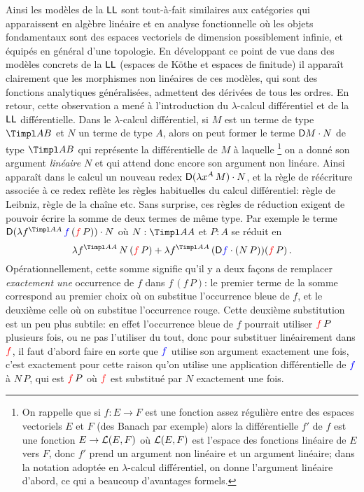\documentclass[a4]{article}
\begin{document}
Ainsi les modèles de la $\hbox{\textsf{LL}}$ sont tout-à-fait similaires aux
catégories qui apparaissent en algèbre linéaire et en analyse
fonctionnelle où les objets fondamentaux sont des espaces vectoriels
de dimension possiblement infinie, et équipés en général d'une
topologie.
%
En développant ce point de vue dans des modèles concrets de la $\hbox{\textsf{LL}}$
(espaces de Köthe et espaces de finitude) il apparaît clairement que
les morphismes non linéaires de ces modèles, qui sont des fonctions
analytiques généralisées, admettent des dérivées de tous les ordres.
%
En retour, cette observation a mené à l'introduction du
$\lambda$-calcul différentiel et de la $\hbox{\textsf{LL}}$ différentielle.
%
Dans le $\lambda$-calcul différentiel, si $M$ est un terme de type
$\Timpl AB$ et $N$ un terme de type $A$, alors on peut former le terme
$\mathsf D{M}\cdot{N}$ de type $\Timpl AB$ qui représente la différentielle de
$M$ à laquelle%
\footnote{On rappelle que si $f:E\to F$ est une fonction assez
  régulière entre des espaces vectoriels $E$ et $F$ (des Banach par
  exemple) alors la différentielle $f'$ de $f$ est une fonction
  $E\to\mathcal{L}(E,F)$ où $\mathcal{L}(E,F)$ est l'espace des fonctions linéaire de
  $E$ vers $F$, donc $f'$ prend un argument non linéaire et un
  argument linéaire; dans la notation adoptée en $\lambda$-calcul
  différentiel, on donne l'argument linéaire d'abord, ce qui a
  beaucoup d'avantages formels.} %
on a donné son argument \emph{linéaire} $N$ et qui attend donc encore
son argument non linéare.
%
Ainsi apparaît dans le calcul un nouveau redex
$\mathsf D{(\lambda x^{A}\,{M})}\cdot{N}$, et la règle de réécriture associée à ce
redex reflète les règles habituelles du calcul différentiel: règle de
Leibniz, règle de la chaîne etc.
%
Sans surprise, ces règles de réduction exigent de pouvoir écrire la
somme de deux termes de même type.
%
Par exemple le terme $\Diffapp{(\Abst f{\Timpl AA}{\BL f\,(\RD f\,P)})}N$ où
$N:\Timpl AA$ et $P:A$ se réduit en
$$
\Abst f{\Timpl AA}{N\,(\RD f\, P)}
+
\Abst f{\Timpl AA}{(\Diffapp{\BL f}{(N\,P)})(\RD f\,P)}\,.
$$
Opérationnellement, cette somme signifie qu'il y a deux façons de
remplacer \emph{exactement une} occurrence de $f$ dans $f\,(f\, P)$: le
premier terme de la somme correspond au premier choix où on substitue
l'occurrence bleue de $f$, et le deuxième celle où on substitue
l'occurrence rouge.
%
Cette deuxième substitution est un peu plus subtile: en effet
l'occurrence bleue de $f$ pourrait utiliser ${\color{red}f}\,P$ plusieurs fois,
ou ne pas l'utiliser du tout, donc pour substituer linéairement dans
${\color{red}f}$, il faut d'abord faire en sorte que ${\color{blue}f}$ utilise son
argument exactement une fois, c'est exactement pour cette raison qu'on
utilise une application différentielle de ${\color{blue}f}$ à $N\,P$, qui est
${\color{red}f}\,P$ où ${\color{red}f}$ est substitué par $N$ exactement une fois.
\end{document}
